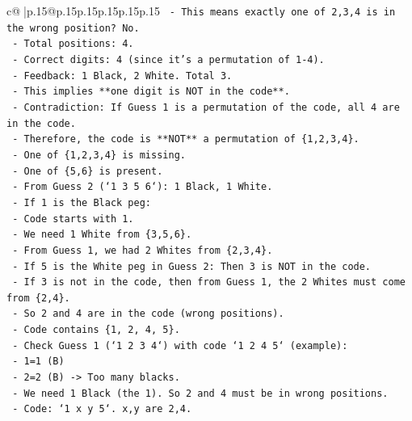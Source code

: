 \documentclass{article}
\begin{document}
{\begin{supertabular}{c@{$\;$}|p{.15\linewidth}@{}p{.15\linewidth}p{.15\linewidth}p{.15\linewidth}p{.15\linewidth}p{.15\linewidth}}
{{{\texttt{            {-}   This means exactly one of 2,3,4 is in the wrong position? No.} \\
\texttt{            {-}   Total positions: 4.} \\
\texttt{            {-}   Correct digits: 4 (since it's a permutation of 1{-}4).} \\
\texttt{            {-}   Feedback: 1 Black, 2 White. Total 3.} \\
\texttt{            {-}   This implies **one digit is NOT in the code**.} \\
\texttt{            {-}   Contradiction: If Guess 1 is a permutation of the code, all 4 are in the code.} \\
\texttt{            {-}   Therefore, the code is **NOT** a permutation of \{1,2,3,4\}.} \\
\texttt{            {-}   One of \{1,2,3,4\} is missing.} \\
\texttt{            {-}   One of \{5,6\} is present.} \\
\texttt{            {-}   From Guess 2 (`1 3 5 6`): 1 Black, 1 White.} \\
\texttt{            {-}   If 1 is the Black peg:} \\
\texttt{                {-}   Code starts with 1.} \\
\texttt{                {-}   We need 1 White from \{3,5,6\}.} \\
\texttt{                {-}   From Guess 1, we had 2 Whites from \{2,3,4\}.} \\
\texttt{                {-}   If 5 is the White peg in Guess 2: Then 3 is NOT in the code.} \\
\texttt{                    {-}   If 3 is not in the code, then from Guess 1, the 2 Whites must come from \{2,4\}.} \\
\texttt{                    {-}   So 2 and 4 are in the code (wrong positions).} \\
\texttt{                    {-}   Code contains \{1, 2, 4, 5\}.} \\
\texttt{                    {-}   Check Guess 1 (`1 2 3 4`) with code `1 2 4 5` (example):} \\
\texttt{                        {-}   1=1 (B)} \\
\texttt{                        {-}   2=2 (B) {-}> Too many blacks.} \\
\texttt{                    {-}   We need 1 Black (the 1). So 2 and 4 must be in wrong positions.} \\
\texttt{                    {-}   Code: `1 x y 5`. x,y are 2,4.} \\
}}}
\end{supertabular}}
\end{document}
